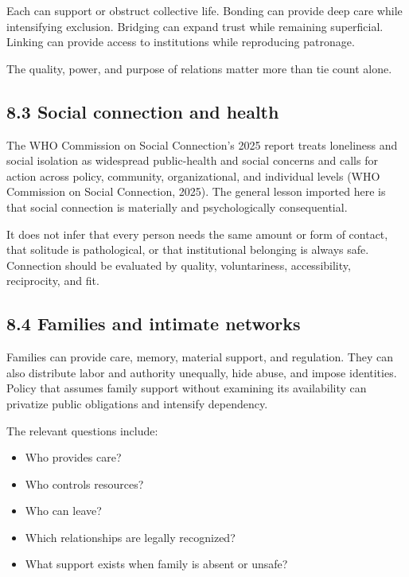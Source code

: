 \documentclass[
  11pt,
]{article}
\providecommand{\tightlist}{%
  \setlength{\itemsep}{0pt}\setlength{\parskip}{0pt}}
\begin{document}
Each can support or obstruct collective life. Bonding can provide deep
care while intensifying exclusion. Bridging can expand trust while
remaining superficial. Linking can provide access to institutions while
reproducing patronage.

The quality, power, and purpose of relations matter more than tie count
alone.

\subsection{8.3 Social connection and
health}\label{social-connection-and-health}

The WHO Commission on Social Connection's 2025 report treats loneliness
and social isolation as widespread public-health and social concerns and
calls for action across policy, community, organizational, and
individual levels (WHO Commission on Social Connection, 2025). The
general lesson imported here is that social connection is materially and
psychologically consequential.

It does not infer that every person needs the same amount or form of
contact, that solitude is pathological, or that institutional belonging
is always safe. Connection should be evaluated by quality,
voluntariness, accessibility, reciprocity, and fit.

\subsection{8.4 Families and intimate
networks}\label{families-and-intimate-networks}

Families can provide care, memory, material support, and regulation.
They can also distribute labor and authority unequally, hide abuse, and
impose identities. Policy that assumes family support without examining
its availability can privatize public obligations and intensify
dependency.

The relevant questions include:

\begin{itemize}
\tightlist
\item
  Who provides care?
\item
  Who controls resources?
\item
  Who can leave?
\item
  Which relationships are legally recognized?
\item
  What support exists when family is absent or unsafe?
\end{itemize}
\end{document}
